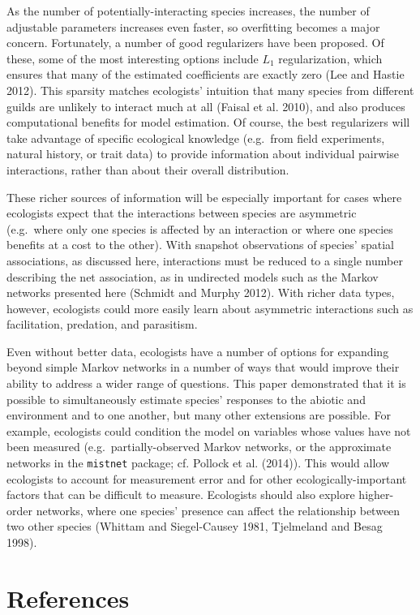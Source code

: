 \documentclass[12pt,]{article}
\begin{document}
\begin{spacing}{1.9}
\begin{flushleft}
As the number of potentially-interacting species increases, the number
of adjustable parameters increases even faster, so overfitting becomes a
major concern. Fortunately, a number of good regularizers have been
proposed. Of these, some of the most interesting options include \(L_1\)
regularization, which ensures that many of the estimated coefficients
are exactly zero (Lee and Hastie 2012). This sparsity matches
ecologists' intuition that many species from different guilds are
unlikely to interact much at all (Faisal et al. 2010), and also produces
computational benefits for model estimation. Of course, the best
regularizers will take advantage of specific ecological knowledge
(e.g.~from field experiments, natural history, or trait data) to provide
information about individual pairwise interactions, rather than about
their overall distribution.

These richer sources of information will be especially important for
cases where ecologists expect that the interactions between species are
asymmetric (e.g.~where only one species is affected by an interaction or
where one species benefits at a cost to the other). With snapshot
observations of species' spatial associations, as discussed here,
interactions must be reduced to a single number describing the net
association, as in undirected models such as the Markov networks
presented here (Schmidt and Murphy 2012). With richer data types,
however, ecologists could more easily learn about asymmetric
interactions such as facilitation, predation, and parasitism.

Even without better data, ecologists have a number of options for
expanding beyond simple Markov networks in a number of ways that would
improve their ability to address a wider range of questions. This paper
demonstrated that it is possible to simultaneously estimate species'
responses to the abiotic and environment and to one another, but many
other extensions are possible. For example, ecologists could condition
the model on variables whose values have not been measured
(e.g.~partially-observed Markov networks, or the approximate networks in
the \texttt{mistnet} package; cf. Pollock et al. (2014)). This would
allow ecologists to account for measurement error and for other
ecologically-important factors that can be difficult to measure.
Ecologists should also explore higher-order networks, where one species'
presence can affect the relationship between two other species (Whittam
and Siegel-Causey 1981, Tjelmeland and Besag 1998).

\section*{References}\label{references}


\end{flushleft}
\end{spacing}
\end{document}
